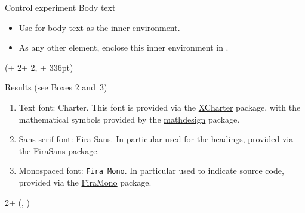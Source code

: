 \documentclass{beamer}
\newlength{\blockThree}
\newlength{\blockFour}
\begin{document}
\begin{frame}[t]
\begin{textblock*}{\colwidth}
\begin{parblock}{Control experiment}
	\alert{Body text}
	\begin{itemize}
		\item Use  for body text as the inner environment.
		\item As any other element, enclose this inner environment in .
	\end{itemize}
\end{parblock}

\end{textblock*}




\begin{textblock*}{\colwidth}(\leftmargin + 2\colwidth + 2\colsep, \blockThree + 336pt)

\begin{parblock}{Results {\mdseries(see Boxes 2 and~3)}}
	\vspace{-1.333333\baselineskip}  %
	\begin{enumerate}
		\item \alert{Text font:} \textrm{Charter}. This font is provided via the \href{https://ctan.org/pkg/xcharter}{XCharter} package, with the mathematical symbols provided by the \href{https://ctan.org/pkg/mathdesign}{mathdesign} package. 
		\item \alert{Sans-serif font:} \textsf{Fira Sans}. In particular used for the headings, provided via the \href{https://ctan.org/pkg/fira}{FiraSans} package.
		\item \alert{Monospaced font:} \texttt{Fira Mono}. In particular used to indicate source code, provided via the \href{https://ctan.org/pkg/fira}{FiraMono} package.
	\end{enumerate}
\end{parblock}

\end{textblock*}




\begin{textblock*}{2\colwidth + \colsep}(\leftmargin, \blockFour)


\end{textblock*}
\end{frame}
\end{document}
